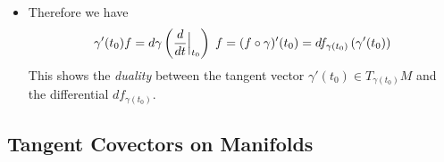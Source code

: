 \documentclass[11pt]{article}
\begin{document}
\begin{itemize}
\item \begin{remark}
Therefore we have
\begin{align*}
\gamma'(t_0)f = d\gamma\left(\frac{d}{dt}\Bigr|_{t_0}\right)\;f =  (f \circ \gamma)'(t_0) = df_{\gamma(t_0)}\left(\gamma'(t_0)\right)
\end{align*} This shows the \emph{duality} between the tangent vector $\gamma'(t_0) \in T_{\gamma(t_0)}M$ and the differential $df_{\gamma(t_0)}$. 
\end{remark}
\end{itemize}



\subsection{Tangent Covectors on Manifolds}
\end{document}
